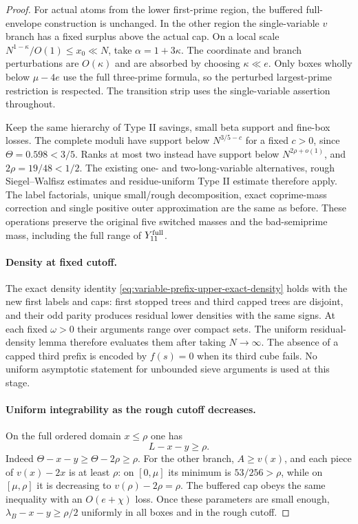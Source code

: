 \begin{proof}
For actual atoms from the lower first-prime region, the buffered
full-envelope construction is unchanged. In the other region the
single-variable $v$ branch has a fixed surplus above the actual
cap. On a local scale $N^{1-\kappa}/O(1)\le x_0\ll N$, take
$\alpha=1+3\kappa$. The coordinate and branch perturbations are
$O(\kappa)$ and are absorbed by choosing $\kappa\ll e$.
Only boxes wholly below $\mu-4e$ use the full three-prime
formula, so the perturbed largest-prime restriction is respected.
The transition strip uses the single-variable assertion throughout.

Keep the same hierarchy of Type II savings, small beta support
and fine-box losses. The complete moduli have support below
$N^{3/5-c}$ for a fixed $c>0$, since $\Theta=0.598<3/5$.
Ranks at most two instead have support below
$N^{2\rho+o(1)}$, and $2\rho=19/48<1/2$.
The existing one- and two-long-variable alternatives, rough
Siegel--Walfisz estimates and residue-uniform Type II estimate
therefore apply. The label factorials, unique small/rough
decomposition, exact coprime-mass correction and single positive
outer approximation are the same as before. These operations
preserve the original five switched masses and the bad-semiprime
mass, including the full range of $Y_{11}^{\rm full}$.

\paragraph{Density at fixed cutoff.}
The exact density identity
\eqref{eq:variable-prefix-upper-exact-density} holds with the
new first labels and caps: first stopped trees and third capped
trees are disjoint, and their odd parity produces residual lower
densities with the same signs. At each fixed $\omega>0$ their
arguments range over compact sets. The uniform residual-density
lemma therefore evaluates them after taking $N\to\infty$.
The absence of a capped third prefix is encoded by $f(s)=0$
when its third cube fails. No uniform asymptotic statement for
unbounded sieve arguments is used at this stage.

\paragraph{Uniform integrability as the rough cutoff decreases.}
On the full ordered domain $x\le\rho$ one has
\begin{equation}\label{eq:extended-prefix-residual-margin}
 L-x-y\ge\rho.
\end{equation}
Indeed $\Theta-x-y\ge\Theta-2\rho\ge\rho$. For the other
branch, $A\ge v(x)$, and each piece of $v(x)-2x$ is at least
$\rho$: on $[0,\mu]$ its minimum is $53/256>\rho$, while on
$[\mu,\rho]$ it is decreasing to
$v(\rho)-2\rho=\rho$.
The buffered cap obeys the same inequality with an
$O(e+\chi)$ loss. Once these parameters are small enough,
$\lambda_B-x-y\ge\rho/2$ uniformly in all boxes and in
the rough cutoff.


\end{proof}
